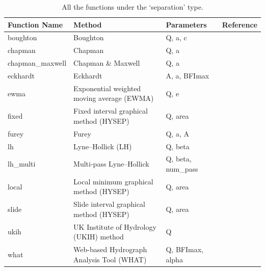 \documentclass[hydrology,article,submit,pdftex,moreauthors]{Definitions/mdpi}
\begin{document}
\begin{table}[H]
\caption{All the functions under the `separation' type.\label{tab:separation}}
\small
\begin{tabularx}{\textwidth}{llXl}
\toprule
\textbf{Function Name} & \textbf{Method} & \textbf{Parameters} & \textbf{Reference} \\
\midrule
boughton        & Boughton                                      & Q, a, c                                              & \cite{ref11} \\
chapman         & Chapman                                       & Q, a                                                 & \cite{ref4}  \\
chapman\_maxwell & Chapman \& Maxwell                            & Q, a                                                 & \cite{ref1}  \\
eckhardt        & Eckhardt                                      & A, a, BFImax                                         & \cite{ref5}  \\
ewma            & Exponential weighted moving average (EWMA)    & Q, e                                                 & \cite{ref12} \\
fixed           & Fixed interval graphical method (HYSEP)       & Q, area                                              & \cite{ref13} \\
furey           & Furey                                         & Q, a, A                                              & \cite{ref14} \\
lh              & Lyne--Hollick (LH)                            & Q, beta                                              & \cite{ref15} \\
lh\_multi       & Multi-pass Lyne--Hollick                      & Q, beta, num\_pass                                   & \cite{ref16} \\
local           & Local minimum graphical method (HYSEP)        & Q, area                                              & \cite{ref17} \\
slide           & Slide interval graphical method (HYSEP)       & Q, area                                              & \cite{ref18} \\
ukih            & UK Institute of Hydrology (UKIH) method       & Q                                                    & \cite{ref7}  \\
what            & Web-based Hydrograph Analysis Tool (WHAT)     & Q, BFImax, alpha                                     & \cite{ref19} \\

\end{tabularx}
\end{table}
\end{document}
